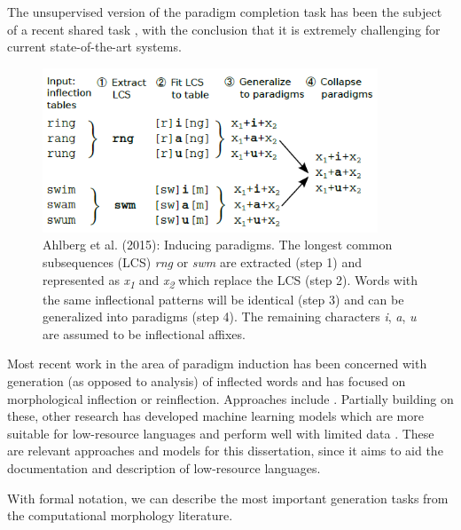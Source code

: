The unsupervised version of the paradigm completion task \citep{jin2020unsupervised} has been the subject of a recent shared task \citep{kann2020sigmorphon}, with the conclusion that it is extremely challenging for current state-of-the-art systems. 

\begin{figure}[tb]
\begin{center}
\includegraphics[width=10cm]{figs/Ahlberg2015-LCS.PNG}
\caption[Ahlberg et al. (2015)]{Ahlberg et al. (2015): Inducing paradigms. The longest common subsequences (LCS) \textit{rng} or \textit{swm} are extracted (step 1) and represented as \textit{x\textsubscript{1}} and \textit{x\textsubscript{2}} which replace the LCS (step 2). Words with the same inflectional patterns will be identical (step 3) and can be generalized into paradigms (step 4). The remaining characters \textit{i}, \textit{a}, \textit{u} are assumed to be inflectional affixes.}
\label{fig:LCS}
\end{center}
\end{figure}


Most recent work in the area of paradigm induction has been concerned with generation (as opposed to analysis) of inflected words and has focused on morphological inflection or reinflection. Approaches include \citet{durrett-denero-2013-supervised,nicolai-etal-2015-inflection,faruqui-etal-2016-morphological,kann-schutze-2016-single,aharoni-goldberg-2017-morphological}. Partially building on these, other research has developed machine learning models which are more suitable for low-resource languages and perform well with limited data \citep{kann-etal-2017-one,sharma-etal-2018-iit,makarov-clematide-2018-imitation,wu-cotterell-2019-exact,kann2020learning,wu2020applying}. These are relevant approaches and models for this dissertation, since it aims to aid the documentation and description of low-resource languages. 

With formal notation, we can describe the most important generation tasks from the computational morphology literature. 


